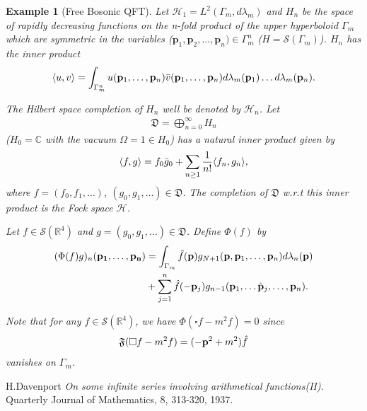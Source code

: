 \documentclass[a4paper,10pt]{amsart}
\newtheorem{example}{Example}[section]
\newcommand{\HHH}{\mathcal H} %
\newcommand{\SSS}{\mathcal S}
\newcommand{\FFF}{\mathfrak F}
\newcommand{\DDD}{\mathfrak D}
\newcommand{\C}{\mathbb C} %
\newcommand{\R}{\mathbb R}  %
\begin{document}
\begin{example}[Free Bosonic QFT]
Let $\HHH_{1} = L^{2}(\Gamma_m, d\lambda_m)$ and 
$\mathit{H}_n$ be the space of rapidly decreasing functions on 
the n-fold product of the upper hyperboloid $\Gamma_m$ which are
symmetric in the variables ($\mathbf{p}_1, \mathbf{p}_2, \ldots, 
\mathbf{p}_n) \in \Gamma_{m}^{n}$ ($\mathit{H} = \SSS(\Gamma_m)$).
$\mathit{H}_n$ has the inner product
\begin{align*}
    \langle u, v \rangle = \int_{\Gamma_m^{n}}u(\mathbf{p}_1, \ldots,
        \mathbf{p}_n) \Bar{v}(\mathbf{p}_1, \ldots, \mathbf{p}_n)
        d\lambda_{m}(\mathbf{p}_1)\ldots d\lambda_{m}(\mathbf{p}_n).
\end{align*}

The Hilbert space completion of $\mathit{H}_n$ well be denoted by
$\HHH_n$. Let
\begin{align*}
    \DDD = \bigoplus_{n=0}^{\infty}\mathit{H}_n 
\end{align*}
($\mathit{H}_0 = \C$ with the vacuum $\Omega = 1 \in \mathit{H}_0$) has
a natural inner product given by
\begin{align*}
    \langle f, g \rangle = f_0 \Bar{g}_{0} + \sum_{n \geq 1}
    \frac{1}{n!} \langle f_n, g_n \rangle,
\end{align*}
where $f = (f_0, f_1, \ldots)$, $(g_0, g_1, \ldots) \in \DDD$. The 
completion of $\DDD$ w.r.t this inner product is the Fock space $\HHH$.

Let $f \in \SSS(\R^{4})$ and $g = (g_0, g_1, \ldots) \in \DDD$.
Define $\Phi(f)$ by
\begin{align*}
    (\Phi(f)g)_n(\mathbf{p_1}, \ldots, \mathbf{p_n}) &= 
    \int_{\Gamma_{m}} \Hat{f}(\mathbf{p})g_{N+1}(\mathbf{p},
    \mathbf{p}_1, \ldots, \mathbf{p}_n) d\lambda_{n}(\mathbf{p}) \\
    & + \sum_{j=1}^{n} \Hat{f}(-\mathbf{p}_j) g_{n-1}(\mathbf{p}_1,
    \ldots \Hat{\mathbf{p}}_{j}, \ldots, \mathbf{p}_n).
\end{align*}

Note that for any $f \in \SSS(\R^4)$, we have $\Phi(\square f - m^2 f) = 0$
since
\begin{align*}
    \FFF(\square f - m^2 f) = (-\mathbf{p}^2 + m^2)\Hat{f} 
\end{align*}
vanishes on $\Gamma_m$.

\end{example}
\begin{thebibliography}{9}
  H.Davenport
  \emph{On some infinite series involving arithmetical functions(II)}.
  Quarterly Journal of Mathematics, 8,
  313-320, 1937.

\end{thebibliography}
\end{document}
